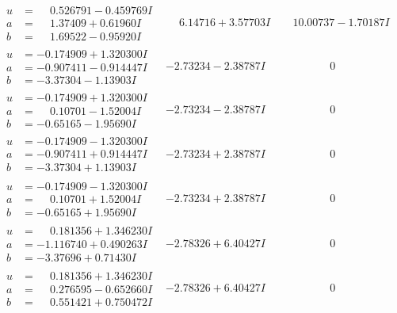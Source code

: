 \documentclass[1p]{elsarticle_modified}
\theoremstyle{definition}
\begin{document}
$$\begin{array}{c|c|c}
\begin{aligned}
u &= \phantom{-}0.526791 - 0.459769 I \\
a &= \phantom{-}1.37409 + 0.61960 I \\
b &= \phantom{-}1.69522 - 0.95920 I\end{aligned}
 & \phantom{-}6.14716 + 3.57703 I & \phantom{-}10.00737 - 1.70187 I \\ \hline\begin{aligned}
u &= -0.174909 + 1.320300 I \\
a &= -0.907411 - 0.914447 I \\
b &= -3.37304 - 1.13903 I\end{aligned}
 & -2.73234 - 2.38787 I & \phantom{-0.000000 } 0 \\ \hline\begin{aligned}
u &= -0.174909 + 1.320300 I \\
a &= \phantom{-}0.10701 - 1.52004 I \\
b &= -0.65165 - 1.95690 I\end{aligned}
 & -2.73234 - 2.38787 I & \phantom{-0.000000 } 0 \\ \hline\begin{aligned}
u &= -0.174909 - 1.320300 I \\
a &= -0.907411 + 0.914447 I \\
b &= -3.37304 + 1.13903 I\end{aligned}
 & -2.73234 + 2.38787 I & \phantom{-0.000000 } 0 \\ \hline\begin{aligned}
u &= -0.174909 - 1.320300 I \\
a &= \phantom{-}0.10701 + 1.52004 I \\
b &= -0.65165 + 1.95690 I\end{aligned}
 & -2.73234 + 2.38787 I & \phantom{-0.000000 } 0 \\ \hline\begin{aligned}
u &= \phantom{-}0.181356 + 1.346230 I \\
a &= -1.116740 + 0.490263 I \\
b &= -3.37696 + 0.71430 I\end{aligned}
 & -2.78326 + 6.40427 I & \phantom{-0.000000 } 0 \\ \hline\begin{aligned}
u &= \phantom{-}0.181356 + 1.346230 I \\
a &= \phantom{-}0.276595 - 0.652660 I \\
b &= \phantom{-}0.551421 + 0.750472 I\end{aligned}
 & -2.78326 + 6.40427 I & \phantom{-0.000000 } 0\\

\end{array}$$
\end{document}
